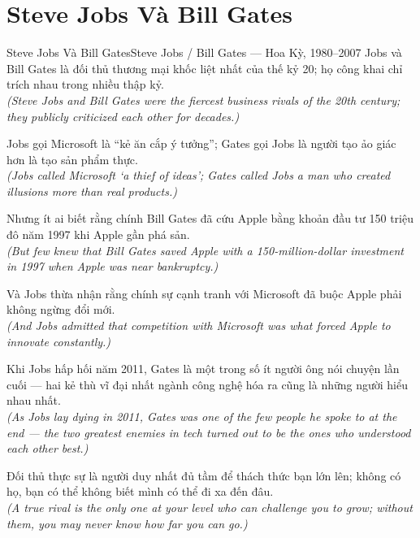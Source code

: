 \section{Steve Jobs Và Bill Gates}
\begin{truyen}{Steve Jobs Và Bill Gates}{Steve Jobs / Bill Gates --- Hoa Kỳ, 1980--2007}
 Jobs và Bill Gates là đối thủ thương mại khốc liệt nhất của thế kỷ 20; họ công khai chỉ trích nhau trong nhiều thập kỷ.\\[4pt]
\textit{(Steve Jobs and Bill Gates were the fiercest business rivals of the 20th century; they publicly criticized each other for decades.)}

Jobs gọi Microsoft là ``kẻ ăn cắp ý tưởng''; Gates gọi Jobs là người tạo ảo giác hơn là tạo sản phẩm thực.\\[4pt]
\textit{(Jobs called Microsoft `a thief of ideas'; Gates called Jobs a man who created illusions more than real products.)}

Nhưng ít ai biết rằng chính Bill Gates đã cứu Apple bằng khoản đầu tư 150 triệu đô năm 1997 khi Apple gần phá sản.\\[4pt]
\textit{(But few knew that Bill Gates saved Apple with a 150-million-dollar investment in 1997 when Apple was near bankruptcy.)}

Và Jobs thừa nhận rằng chính sự cạnh tranh với Microsoft đã buộc Apple phải không ngừng đổi mới.\\[4pt]
\textit{(And Jobs admitted that competition with Microsoft was what forced Apple to innovate constantly.)}

Khi Jobs hấp hối năm 2011, Gates là một trong số ít người ông nói chuyện lần cuối --- hai kẻ thù vĩ đại nhất ngành công nghệ hóa ra cũng là những người hiểu nhau nhất.\\[4pt]
\textit{(As Jobs lay dying in 2011, Gates was one of the few people he spoke to at the end --- the two greatest enemies in tech turned out to be the ones who understood each other best.)}

\end{truyen}
\begin{baihoc}
  Đối thủ thực sự là người duy nhất đủ tầm để thách thức bạn lớn lên; không có họ, bạn có thể không biết mình có thể đi xa đến đâu.\\[4pt]
  \textit{(A true rival is the only one at your level who can challenge you to grow; without them, you may never know how far you can go.)}
\end{baihoc}

